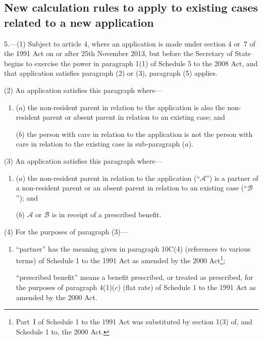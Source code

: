 \documentclass[12pt,a4paper]{article}
\begin{document}
\subsection[5. New calculation rules to apply to existing cases related to a new application]{New calculation rules to apply to existing cases related to a new application}

5.---(1)  Subject to article 4, where an application is made under section 4 or~7 of the 1991 Act on or after 25th November 2013, but before the Secretary of State begins to exercise the power in paragraph 1(1) of Schedule 5 to the 2008 Act, and that application satisfies paragraph (2) or (3), paragraph (5) applies.

(2) An application satisfies this paragraph where—
\begin{enumerate}\item[]
($a$) the non-resident parent in relation to the application is also the non-resident parent or absent parent in relation to an existing case; and

($b$) the person with care in relation to the application is not the person with care in relation to the existing case in sub-paragraph ($a$).
\end{enumerate}

(3) An application satisfies this paragraph where—
\begin{enumerate}\item[]
($a$) the non-resident parent in relation to the application (“$\mathcal{A}$”) is a partner of a non-resident parent or an absent parent in relation to an existing case (“$\mathcal{B}$”); and

($b$) $\mathcal{A}$ or $\mathcal{B}$ is in receipt of a prescribed benefit.
\end{enumerate}

(4) For the purposes of paragraph (3)—
\begin{enumerate}\item[]
“partner” has the meaning given in paragraph 10C(4) (references to various terms) of Schedule 1 to the 1991 Act as amended by the 2000 Act\footnote{Part~I of Schedule 1 to the 1991 Act was substituted by section 1(3) of, and Schedule 1 to, the 2000 Act.};

“prescribed benefit” means a benefit prescribed, or treated as prescribed, for the purposes of paragraph 4(1)($c$)  (flat rate) of Schedule 1 to the 1991 Act as amended by the 2000 Act.
\end{enumerate}
\end{document}
